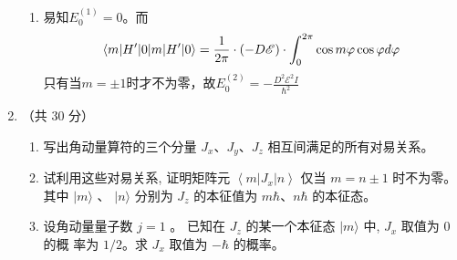 \begin{enumerate}
{\begin{enumerate}
	\item 
	易知$ E_{0}^{(1)}=0 $。而
	\[ \braket{m|H ^{\prime} |0}=\frac{1}{2\pi} \cdot (-D \mathscr{E}) \cdot \int_{0}^{2\pi} \cos m \varphi \cos \varphi d\varphi \]
	只有当$ m=\pm1 $时才不为零，故$ E_{0}^{(2)}=-\frac{D^{2}\mathscr{E}^{2}I}{\hbar^{2}} $
	
\end{enumerate}


}


\newpage
\item 
（共 30 分）
\begin{enumerate}
	\item
写出角动量算符的三个分量 $J_{x} $、$ J_{y} $、$ J_{z}$ 相互间满足的所有对易关系。
	\item 
	试利用这些对易关系, 证明矩阵元 $\left\langle m\left|J_{x}\right| n\right\rangle$ 仅当 $m=n \pm 1$ 时不为零。其中 $|m\rangle$ 、 $|n\rangle$ 分别为 $J_{z}$ 的本征值为 $m \hbar $、$ n \hbar$ 的本征态。
	
	\item 
	设角动量量子数 $j=1$ 。 已知在 $J_{z}$ 的某一个本征态 $|m\rangle$ 中, $J_{x}$ 取值为 0 的概 率为 $1 / 2$。求 $J_{x}$ 取值为 $-\hbar$ 的概率。
	
\end{enumerate}

\end{enumerate}
